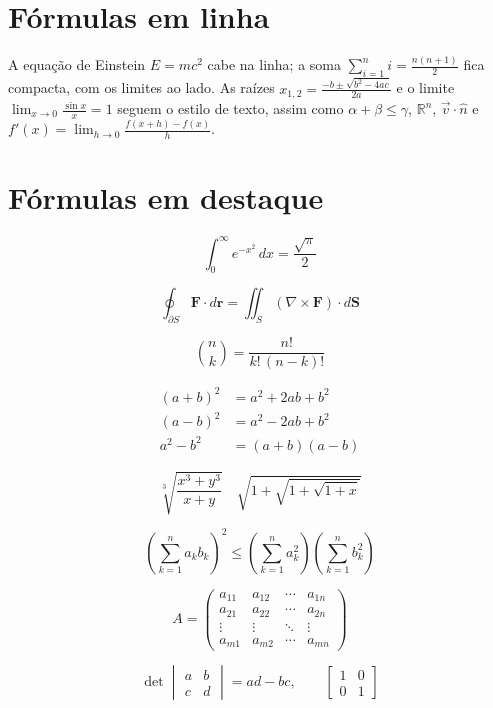 \documentclass{article}
\begin{document}
\section{Fórmulas em linha}

A equação de Einstein $E = mc^2$ cabe na linha; a soma $\sum_{i=1}^{n} i = \frac{n(n+1)}{2}$
fica compacta, com os limites ao lado. As raízes $x_{1,2} = \frac{-b \pm \sqrt{b^2 - 4ac}}{2a}$
e o limite $\lim_{x \to 0} \frac{\sin x}{x} = 1$ seguem o estilo de texto, assim como
$\alpha + \beta \leq \gamma$, $\mathbb{R}^n$, $\vec{v} \cdot \hat{n}$ e $f'(x) = \lim_{h\to 0}\frac{f(x+h)-f(x)}{h}$.

\section{Fórmulas em destaque}

\[ \int_0^\infty e^{-x^2}\,dx = \frac{\sqrt{\pi}}{2} \]

\begin{equation}
  \oint_{\partial S} \mathbf{F} \cdot d\mathbf{r} = \iint_S (\nabla \times \mathbf{F}) \cdot d\mathbf{S} \label{eq:stokes}
\end{equation}

\begin{equation}
  \binom{n}{k} = \frac{n!}{k!\,(n-k)!}
\end{equation}

\begin{align}
  (a+b)^2 &= a^2 + 2ab + b^2 \\
  (a-b)^2 &= a^2 - 2ab + b^2 \nonumber \\
  a^2 - b^2 &= (a+b)(a-b)
\end{align}

\[ \sqrt[3]{\frac{x^3 + y^3}{x + y}} \quad \sqrt{1 + \sqrt{1 + \sqrt{1 + x}}} \]

\[ \left( \sum_{k=1}^{n} a_k b_k \right)^2 \leq \left( \sum_{k=1}^{n} a_k^2 \right) \left( \sum_{k=1}^{n} b_k^2 \right) \]

\[ A = \begin{pmatrix} a_{11} & a_{12} & \cdots & a_{1n} \\ a_{21} & a_{22} & \cdots & a_{2n} \\ \vdots & \vdots & \ddots & \vdots \\ a_{m1} & a_{m2} & \cdots & a_{mn} \end{pmatrix} \]

\[ \det \begin{vmatrix} a & b \\ c & d \end{vmatrix} = ad - bc, \qquad \begin{bmatrix} 1 & 0 \\ 0 & 1 \end{bmatrix} \]
\end{document}
